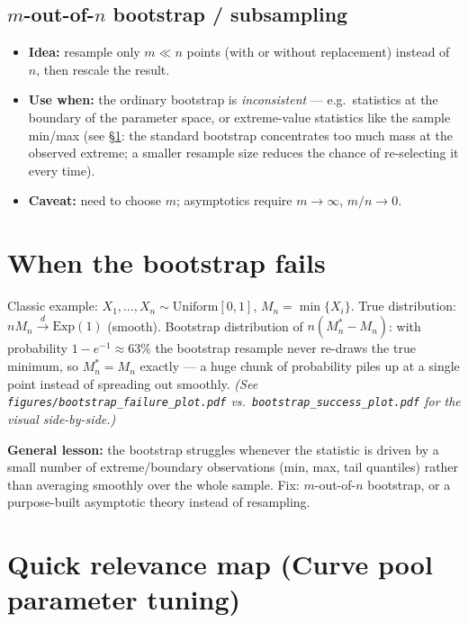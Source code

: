 \documentclass[11pt]{article}
\begin{document}
\subsection*{$m$-out-of-$n$ bootstrap / subsampling}
\begin{itemize}
  \item \textbf{Idea:} resample only $m \ll n$ points (with or without replacement) instead of $n$, then rescale the result.
  \item \textbf{Use when:} the ordinary bootstrap is \emph{inconsistent} --- e.g.\ statistics at the boundary of the parameter space, or extreme-value statistics like the sample min/max (see \S\ref{sec:fails}: the standard bootstrap concentrates too much mass at the observed extreme; a smaller resample size reduces the chance of re-selecting it every time).
  \item \textbf{Caveat:} need to choose $m$; asymptotics require $m\to\infty$, $m/n \to 0$.
\end{itemize}

\section{When the bootstrap fails}
\label{sec:fails}

Classic example: $X_1,\dots,X_n \sim \mathrm{Uniform}[0,1]$, $M_n = \min\{X_i\}$. True distribution: $nM_n \xrightarrow{d} \mathrm{Exp}(1)$ (smooth). Bootstrap distribution of $n(M_n^*-M_n)$: with probability $1-e^{-1}\approx 63\%$ the bootstrap resample never re-draws the true minimum, so $M_n^*=M_n$ exactly --- a huge chunk of probability piles up at a single point instead of spreading out smoothly. \emph{(See \texttt{figures/bootstrap\_failure\_plot.pdf} vs.\ \texttt{bootstrap\_success\_plot.pdf} for the visual side-by-side.)}

\textbf{General lesson:} the bootstrap struggles whenever the statistic is driven by a small number of extreme/boundary observations (min, max, tail quantiles) rather than averaging smoothly over the whole sample. Fix: $m$-out-of-$n$ bootstrap, or a purpose-built asymptotic theory instead of resampling.

\section{Quick relevance map (Curve pool parameter tuning)}
\end{document}
